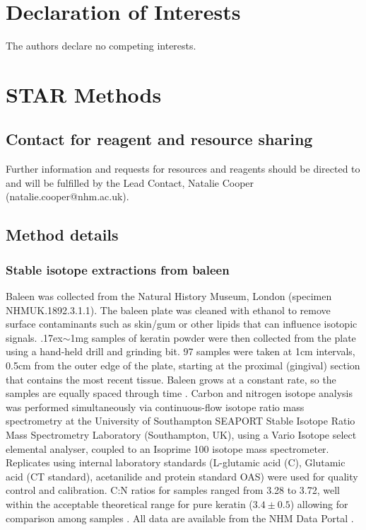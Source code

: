 \documentclass[a4paper,12pt]{article}
\begin{document}
\section{Declaration of Interests}
The authors declare no competing interests.




\section{STAR Methods}

\subsection{Contact for reagent and resource sharing}
Further information and requests for resources and reagents should be directed to and will be fulfilled by the Lead Contact, Natalie Cooper (natalie.cooper@nhm.ac.uk).

\subsection{Method details}
\subsubsection{Stable isotope extractions from baleen}
Baleen was collected from the Natural History Museum, London (specimen NHMUK.1892.3.1.1). 
The baleen plate was cleaned with ethanol to remove surface contaminants such as skin/gum or other lipids that can influence isotopic signals. 
{\raise.17ex\hbox{$\scriptstyle\sim$}}1mg samples of keratin powder were then collected from the plate using a hand-held drill and grinding bit. 
97 samples were taken at 1cm intervals, 0.5cm from the outer edge of the plate, starting at the proximal (gingival) section that contains the most recent tissue. 
Baleen grows at a constant rate, so the samples are equally spaced through time \cite{best1996stable}. 
Carbon and nitrogen isotope analysis was performed simultaneously via continuous-flow isotope ratio mass spectrometry at the University of Southampton SEAPORT Stable Isotope Ratio Mass Spectrometry Laboratory (Southampton, UK), using a Vario Isotope select elemental analyser, coupled to an Isoprime 100 isotope mass spectrometer. 
Replicates using internal laboratory standards (L-glutamic acid (C), Glutamic acid (CT standard), acetanilide and protein standard OAS) were used for quality control and calibration. 
C:N ratios for samples ranged from 3.28\text{\textperthousand} to 3.72\text{\textperthousand}, well within the acceptable theoretical range for pure keratin ($3.4\pm0.5$) allowing for comparison among samples \cite{hobson1998stable}. 
All data are available from the NHM Data Portal \cite{data-set}.
 
\end{document}
